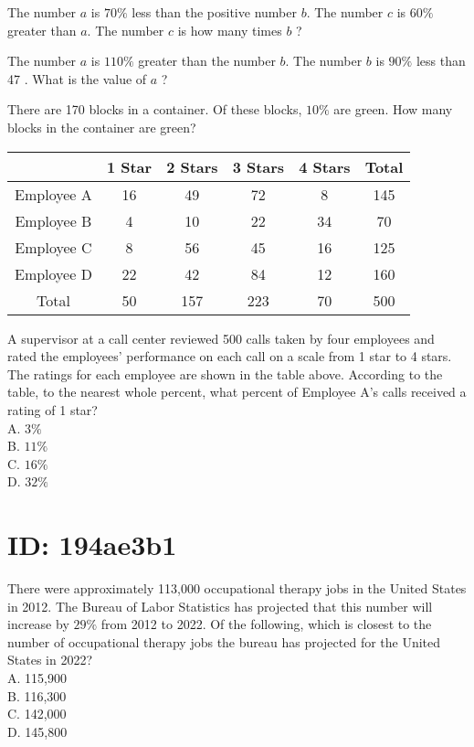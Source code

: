 The number $a$ is $70 \%$ less than the positive number $b$. The number $c$ is $60 \%$ greater than $a$. The number $c$ is how many times $b$ ?

The number $a$ is $110 \%$ greater than the number $b$. The number $b$ is $90 \%$ less than 47 . What is the value of $a$ ?

There are 170 blocks in a container. Of these blocks, $10 \%$ are green. How many blocks in the container are green?

\begin{center}
\begin{tabular}{|c|c|c|c|c|c|}
\hline
 & 1 Star & 2 Stars & 3 Stars & 4 Stars & Total \\
\hline
Employee A & 16 & 49 & 72 & 8 & 145 \\
\hline
Employee B & 4 & 10 & 22 & 34 & 70 \\
\hline
Employee C & 8 & 56 & 45 & 16 & 125 \\
\hline
Employee D & 22 & 42 & 84 & 12 & 160 \\
\hline
Total & 50 & 157 & 223 & 70 & 500 \\
\hline
\end{tabular}
\end{center}

A supervisor at a call center reviewed 500 calls taken by four employees and rated the employees' performance on each call on a scale from 1 star to 4 stars. The ratings for each employee are shown in the table above. According to the table, to the nearest whole percent, what percent of Employee A's calls received a rating of 1 star?\\
A. $3 \%$\\
B. $11 \%$\\
C. $16 \%$\\
D. $32 \%$

\section*{ID: 194ae3b1}
There were approximately 113,000 occupational therapy jobs in the United States in 2012. The Bureau of Labor Statistics has projected that this number will increase by $29 \%$ from 2012 to 2022. Of the following, which is closest to the number of occupational therapy jobs the bureau has projected for the United States in 2022?\\
A. 115,900\\
B. 116,300\\
C. 142,000\\
D. 145,800

